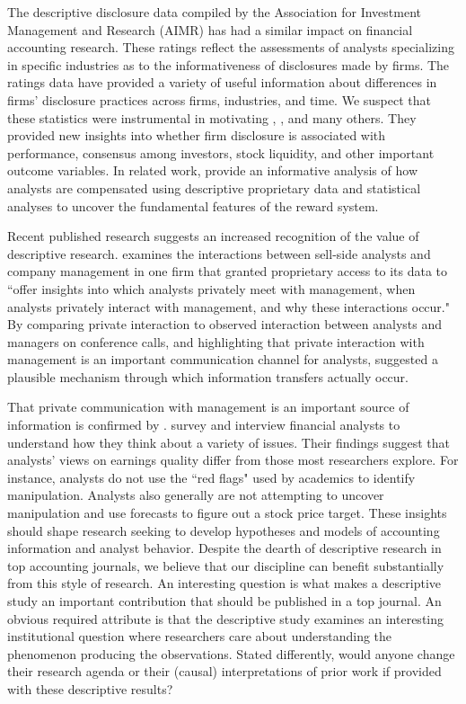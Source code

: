 \documentclass[12pt,reqno,titlepage]{amsart}
\theoremstyle{definition}
\begin{document}
\begin{doublespace}
The descriptive disclosure data compiled by the Association for Investment Management and Research (AIMR) has had a similar impact on financial accounting research. 
These ratings reflect the assessments of analysts specializing in specific industries as to the informativeness of disclosures made by firms. The ratings data have provided a variety of useful 
information about differences in firms' disclosure practices across firms, industries, and time.
We suspect that these statistics were instrumental in motivating \citet{Lang:1993iv,Lang:1996dk}, \cite{Healy:1999ig}, and many others. They provided new insights into whether firm disclosure is associated with performance, consensus among investors, stock liquidity, and other important outcome variables.
In related work, \cite{Groysberg:2011dk} provide an informative analysis of how analysts are compensated using descriptive proprietary data and statistical analyses to uncover the fundamental features of the reward system.

Recent published research suggests an increased recognition of the value of descriptive research. 
\citet{Soltes:2013ba} examines the interactions between sell-side analysts and company management in one firm that granted proprietary access to its data to ``offer insights into which analysts privately meet with management, when analysts privately interact with management, and why these interactions occur."
By comparing private interaction to observed interaction between analysts and managers on conference calls, and highlighting that private interaction with management is an important communication channel for analysts, \citet{Soltes:2013ba} suggested a plausible mechanism through which information transfers actually occur. 

That private communication with management is an important source of information is confirmed by \citet{Brown:2015kd}. 
\citet{Brown:2015kd} survey and interview financial analysts to understand how they think about a variety of issues. 
Their findings suggest that analysts' views on earnings quality differ from those most researchers explore. 
For instance, analysts do not use the ``red flags" used by academics to identify manipulation. Analysts also generally are not attempting to uncover manipulation and use forecasts to figure out a stock price target. These insights should shape research seeking to develop hypotheses and models of accounting information and analyst behavior. 
Despite the dearth of descriptive research in top accounting journals, we believe that our discipline can benefit substantially from this style of research. 
An interesting question is what makes a descriptive study an important contribution that should be published in a top journal.
An obvious required attribute is that the descriptive study examines an interesting institutional question where researchers care about understanding the phenomenon producing the observations.
Stated differently, would anyone change their research agenda or their (causal) interpretations of prior work if provided with these descriptive results?


\end{doublespace}
\end{document}

